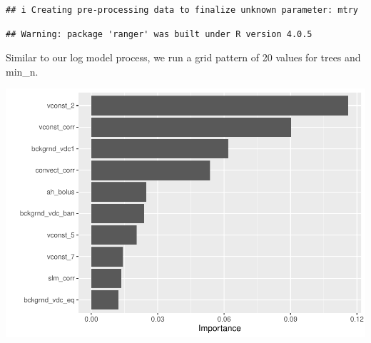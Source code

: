 \documentclass[
  11pt,
]{article}
\newenvironment{Shaded}{\begin{snugshade}}{\end{snugshade}}
\newcommand{\DataTypeTok}[1]{\textcolor[rgb]{0.13,0.29,0.53}{#1}}
\newcommand{\KeywordTok}[1]{\textcolor[rgb]{0.13,0.29,0.53}{\textbf{#1}}}
\newcommand{\NormalTok}[1]{#1}
\newcommand{\OperatorTok}[1]{\textcolor[rgb]{0.81,0.36,0.00}{\textbf{#1}}}
\newcommand{\StringTok}[1]{\textcolor[rgb]{0.31,0.60,0.02}{#1}}
\begin{document}
\begin{verbatim}
## i Creating pre-processing data to finalize unknown parameter: mtry
\end{verbatim}

\begin{verbatim}
## Warning: package 'ranger' was built under R version 4.0.5
\end{verbatim}

\begin{Shaded}
\end{Shaded}

Similar to our log model process, we run a grid pattern of 20 values for
trees and min\_n.

\begin{Shaded}
\end{Shaded}

\includegraphics{Project-5-MTW_files/figure-latex/unnamed-chunk-14-1.pdf}
\end{document}
